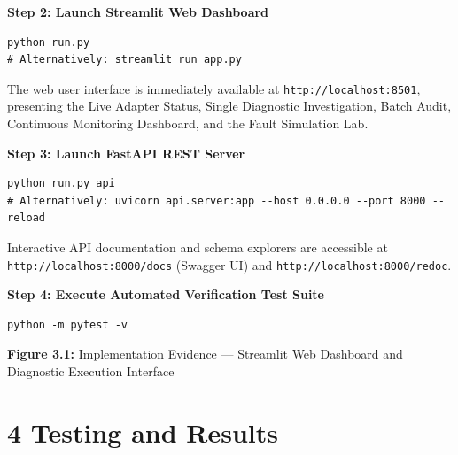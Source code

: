\documentclass[
]{article}
\begin{document}
\textbf{Step 2: Launch Streamlit Web Dashboard}
\begin{verbatim}
python run.py
# Alternatively: streamlit run app.py
\end{verbatim}
The web user interface is immediately available at \texttt{http://localhost:8501}, presenting the Live Adapter Status, Single Diagnostic Investigation, Batch Audit, Continuous Monitoring Dashboard, and the Fault Simulation Lab.

\vspace{0.2cm}
\textbf{Step 3: Launch FastAPI REST Server}
\begin{verbatim}
python run.py api
# Alternatively: uvicorn api.server:app --host 0.0.0.0 --port 8000 --reload
\end{verbatim}
Interactive API documentation and schema explorers are accessible at \texttt{http://localhost:8000/docs} (Swagger UI) and \texttt{http://localhost:8000/redoc}.

\vspace{0.2cm}
\textbf{Step 4: Execute Automated Verification Test Suite}
\begin{verbatim}
python -m pytest -v
\end{verbatim}

\vspace{0.4cm}

\begin{center}
\end{center}

\vspace{0.2cm}
\begin{center}
\textbf{Figure 3.1:} Implementation Evidence --- Streamlit Web Dashboard and Diagnostic Execution Interface
\end{center}

\newpage

\section{4 Testing and Results}\label{testing-and-results}
\end{document}
